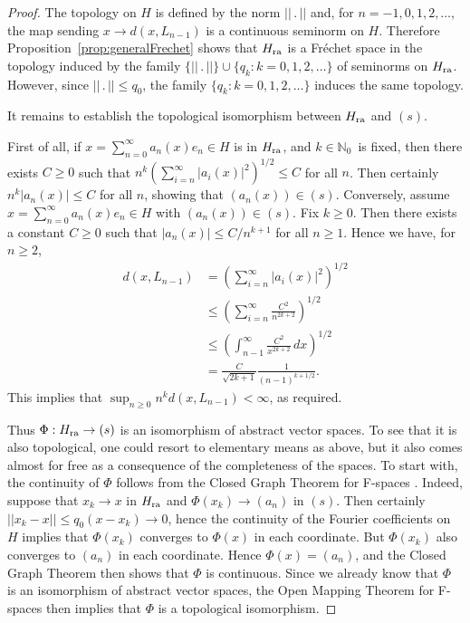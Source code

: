\documentclass[12pt, reqno]{amsart}
\numberwithin{equation}{section}
\theoremstyle{plain}
\theoremstyle{definition}
\begin{document}
\begin{proof}
The topology on $H$ is defined by the norm $||\,.\,||$ and, for $n=-1,0,1,2,\ldots$, the map sending $x\to d(x,L_{n-1})$ is a continuous seminorm on $H$. Therefore Proposition~\ref{prop:generalFrechet} shows that ${H_{\textup{ra}}}$ is a Fr\'echet space in the topology induced by the family $\{||\,.\,||\}\cup\{q_k : k=0,1,2,\ldots\}$ of seminorms on ${H_{\textup{ra}}}$. However, since $||\,.\,||\leq q_0$, the family $\{q_k : k=0,1,2,\ldots\}$ induces the same topology.

It remains to establish the topological isomorphism between ${H_{\textup{ra}}}$ and $(s)$.

First of all, if $x=\sum_{n=0}^\infty a_n(x)e_n\in H$ is in ${H_{\textup{ra}}}$, and $k\in\mathbb N_0$\ is fixed, then there exists $C\geq 0$ such that $n^k\left(\sum_{i=n}^\infty |a_i(x)|^2\right)^{1/2} \leq C$ for all $n$. Then certainly $n^k|a_n(x)|\leq C$ for all $n$, showing that ${({a_n(x)})}\in (s)$. Conversely, assume $x=\sum_{n=0}^\infty a_n(x)e_n\in H$ with ${({a_n(x)})}\in (s)$. Fix $k\geq 0$. Then there exists a constant $C\geq 0$ such that $|a_n(x)|\leq C/n^{k+1}$ for all $n\geq 1$. Hence we have, for $n\geq 2$,
\begin{align*}
d(x,L_{n-1})&=\left(\sum_{i=n}^\infty |a_i(x)|^2\right)^{1/2}\\
&\leq \left(\sum_{i=n}^\infty \frac{C^2}{n^{2k+2}}\right)^{1/2}\\
&\leq \left(\int_{n-1}^\infty \frac{C^2}{x^{2k+2}}\,dx\right)^{1/2}\\
&=\frac{C}{\sqrt{2k+1}}\frac{1}{(n-1)^{k+1/2}}.
\end{align*}
This implies that $\sup_{n\geq 0} n^kd(x,L_{n-1})<\infty$, as required.

Thus ${{\Phi}} :{H_{\textup{ra}}}\to (s)$ is an isomorphism of abstract vector spaces. To see that it is also topological, one could resort to elementary means as above, but it also comes almost for free as a consequence of the completeness of the spaces.
To start with, the continuity of ${{\Phi}}$ follows from the Closed Graph Theorem
for F-spaces \cite[Theorem~2.15]{Ru}. Indeed, suppose that $x_k\rightarrow
x$ in ${H_{\textup{ra}}}$ and ${{\Phi}}(x_k)\rightarrow {({a_n})}$ in $(s)$. Then certainly $|| x_k-x||\leq q_0(x-x_k)\rightarrow 0$, hence the continuity of the Fourier coefficients
on $H$ implies that ${{\Phi}}(x_k)$ converges to ${{\Phi}}(x)$ in each coordinate.
But ${{\Phi}}(x_k)$ also converges to ${({a_n})}$ in each coordinate. Hence
${{\Phi}}(x)={({a_n})}$, and the Closed Graph Theorem then shows that ${{\Phi}}$
is continuous. Since we already know that ${{\Phi}}$ is an isomorphism of abstract
vector spaces, the Open Mapping Theorem for F-spaces \cite[Theorem~2.11]{Ru}
then implies that ${{\Phi}}$ is a topological isomorphism.
\end{proof}
\end{document}
